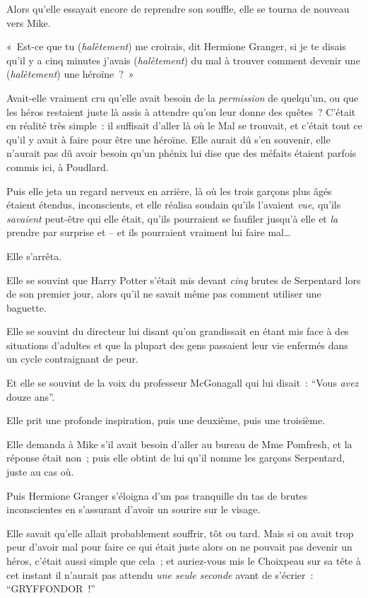Alors qu'elle essayait encore de reprendre son souffle, elle se tourna de nouveau vers Mike.

«~Est-ce que tu (\emph{halètement}) me croirais, dit Hermione Granger, si je te disais qu'il y a cinq minutes j'avais (\emph{halètement}) du mal à trouver comment devenir une (\emph{halètement}) une héroïne~?~»

Avait-elle vraiment cru qu'elle avait besoin de la \emph{permission} de quelqu'un, ou que les héros restaient juste là assis à attendre qu'on leur donne des quêtes~?
C'était en réalité très simple~: il suffisait d'aller là où le Mal se trouvait, et c'était tout ce qu'il y avait à faire pour être une héroïne.
Elle aurait dû s'en souvenir, elle n'aurait pas dû avoir besoin qu'un phénix lui dise que des méfaits étaient parfois commis ici, à Poudlard.

Puis elle jeta un regard nerveux en arrière, là où les trois garçons plus âgés étaient étendus, inconscients, et elle réalisa soudain qu'ils l'avaient \emph{vue}, qu'ils \emph{savaient} peut-être qui elle était, qu'ils pourraient se faufiler jusqu'à elle et \emph{la} prendre par surprise et -- et ils pourraient vraiment lui faire mal…

Elle s'arrêta.

Elle se souvint que Harry Potter s'était mis devant \emph{cinq} brutes de Serpentard lors de son premier jour, alors qu'il ne savait même pas comment utiliser une baguette.

Elle se souvint du directeur lui disant qu'on grandissait en étant mis face à des situations d'adultes et que la plupart des gens passaient leur vie enfermés dans un cycle contraignant de peur.

Et elle se souvint de la voix du professeur McGonagall qui lui disait~: “Vous \emph{avez} douze ans”.

Elle prit une profonde inspiration, puis une deuxième, puis une troisième.

Elle demanda à Mike s'il avait besoin d'aller au bureau de Mme Pomfresh, et la réponse était non~; puis elle obtint de lui qu'il nomme les garçons Serpentard, juste au cas où.

Puis Hermione Granger s'éloigna d'un pas tranquille du tas de brutes inconscientes en s'assurant d'avoir un sourire sur le visage.

Elle savait qu'elle allait probablement souffrir, tôt ou tard.
Mais si on avait trop peur d'avoir mal pour faire ce qui était juste alors on ne pouvait pas devenir un héros, c'était aussi simple que cela~; et auriez-vous mis le Choixpeau sur sa tête à cet instant il n'aurait pas attendu \emph{une seule seconde} avant de s'écrier~: “GRYFFONDOR~!”

